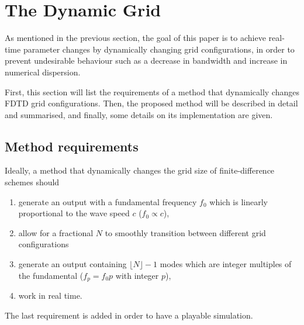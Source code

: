 \section{The Dynamic Grid}
As mentioned in the previous section, the goal of this paper is to achieve real-time  parameter changes by dynamically changing grid configurations, in order to prevent undesirable behaviour such as a decrease in bandwidth and increase in numerical dispersion. %

First, this section will list the requirements of a method that dynamically changes FDTD grid configurations. %
Then, the proposed method will be described in detail and summarised, and finally, some details on its implementation are given. 

\subsection{Method requirements}\label{sec:methodReq}
Ideally, a method that dynamically changes the grid size of finite-difference schemes should
\begin{enumerate}
    \item generate an output with a fundamental frequency $f_0$ %
    which is linearly proportional to the wave speed $c$ ($f_0 \propto c$),
    \item allow for a fractional $N$ to smoothly transition between different grid configurations%
    \item generate an output containing $\lfloor N\rfloor-1$ modes which are integer multiples of the fundamental ($f_p = f_0 p$ with integer $p$),
    \item work in real time.
\end{enumerate}
The last requirement is added in order to have a playable simulation.
%

